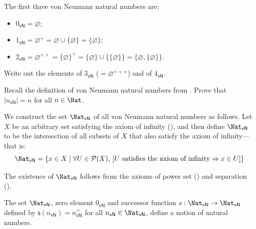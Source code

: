 \begin{example}
The first three von Neumann natural numbers are:
\begin{itemize}
\item $0_{\mathsf{vN}} = \varnothing$;
\item $1_{\mathsf{vN}} = \varnothing^+ = \varnothing \cup \{ \varnothing \} = \{ \varnothing \}$;
\item $2_{\mathsf{vN}} = \varnothing^{++} = \{ \varnothing \}^+ = \{ \varnothing \} \cup \{ \{ \varnothing \} \} = \{ \varnothing, \{ \varnothing \} \}$.
\end{itemize}
\end{example}

\begin{exercise}
Write out the elements of $3_{\mathsf{vN}}$ ($=\varnothing^{+++}$) and of $4_{\mathsf{vN}}$.
\end{exercise}

\begin{exercise}
\label{exSizeOfVonNeumannOrdinals}
Recall the definition of von Neumann natural numbers from . Prove that $|n_{\mathsf{vN}}| = n$ for all $n \in \Nat$.
\end{exercise}

\begin{construction}
\label{cnsNaturalNumbersVonNeumann}
We construct the set $\Nat_{\mathsf{vN}}$ of all von Neumann natural numbers as follows. Let $X$ be an arbitrary set satisfying the axiom of infinity (), and then define $\Nat_{\mathsf{vN}}$ to be the intersection of all subsets of $X$ that also satisfy the axiom of infinity---that is:
\[ \Nat_{\mathsf{vN}} = \{ x \in X \mid \forall U \in \mathcal{P}(X),\, [U \text{ satisfies the axiom of infinity} \Rightarrow x \in U ] \} \]
\end{construction}

The existence of $\Nat_{\mathsf{vN}}$ follows from the axioms of power set () and separation ().

\begin{theorem}
\label{thmVonNeumannNaturalNumbers}
The set $\Nat_{\mathsf{vN}}$, zero element $0_{\mathsf{vN}}$ and successor function $s : \Nat_{\mathsf{vN}} \to \Nat_{\mathsf{vN}}$ defined by $\mathsf{s}(n_{\mathsf{vN}}) = n_{\mathsf{vN}}^+$ for all $n_{\mathsf{vN}} \in \Nat_{\mathsf{vN}}$, define a notion of natural numbers.
\end{theorem}

